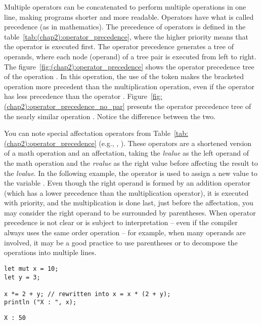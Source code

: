

Multiple operators can be concatenated to perform multiple operations in one
line, making programs shorter and more readable. Operators have what is called
precedence (as in mathematics). The precedence of operators is defined in the
table~\ref{tab:(chap2):operator_precedence}, where the higher priority means
that the operator is executed first. The operator precedence generates a tree of
operands, where each node (operand) of a tree pair is executed from left to
right. The figure~\ref{fig:(chap2):operator_precedence} shows the operator
precedence tree of the operation . In this operation, the
use of the token \token{()} makes the bracketed operation more precedent than
the multiplication operation, even if the operator \token{-} has less precedence
than the operator \token{*}. Figure~\ref{fig:(chap2):operator_precedence_no_par}
presents the operator precedence tree of the nearly similar operation . Notice the difference between the two.



You can note special affectation operators from
Table~\ref{tab:(chap2):operator_precedence} (e.g., \token{+=}, \token{-=}).
These operators are a shortened version of a math operation and an affectation,
taking the \textit{lvalue} as the left operand of the math operation and the
\textit{rvalue} as the right value before affecting the result to the
\textit{lvalue}. In the following example, the \token{+=} operator is used to
assign a new value to the variable . Even though the right operand is
formed by an addition operator (which has a lower precedence than the
multiplication operator), it is executed with priority, and the multiplication
is done last, just before the affectation, you may consider the right operand to
be surrounded by parentheses. When operator precedence is not clear or is
subject to interpretation -- even if the compiler always uses the same order
operation -- for example, when many operands are involved, it may be a good
practice to use parentheses or to decompose the operations into multiple lines.

\begin{lstlisting}[style=coloredVerbatim]
let mut x = 10;
let y = 3;

x *= 2 + y; // rewritten into x = x * (2 + y);
println ("X : ", x);
\end{lstlisting}
\vspace{-10pt}%
\begin{lstlisting}[style=bashVerb]
X : 50
\end{lstlisting}

